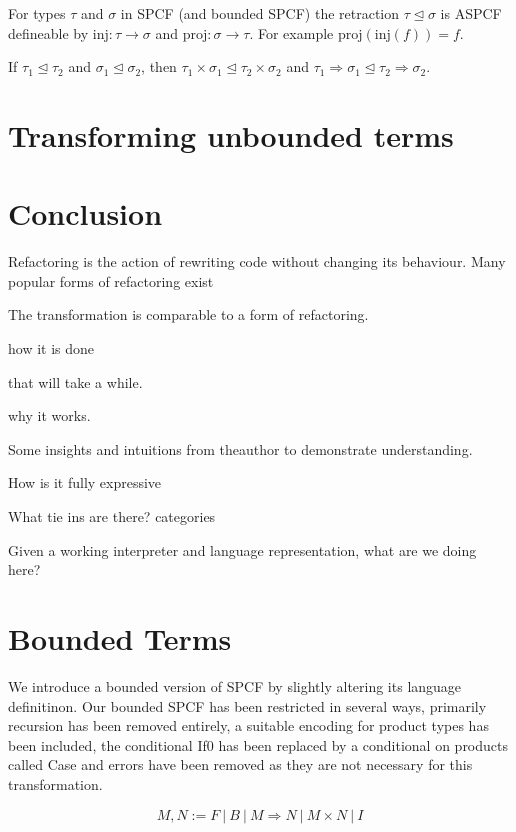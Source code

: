 \documentclass[12pt,a4paper]{report}
\theoremstyle{definition}
\theoremstyle{remark}
\begin{document}
For types $\tau$ and $\sigma$ in SPCF (and bounded SPCF) the retraction $\tau \trianglelefteq \sigma$ is ASPCF defineable by $\text{inj}: \tau \rightarrow \sigma$ and $\text{proj}: \sigma \rightarrow \tau$. For example $\text{proj}(\text{inj}(f))= f$.

If $\tau_1 \trianglelefteq \tau_2$ and $\sigma_1 \trianglelefteq \sigma_2$, then $\tau_1 \times \sigma_1 \trianglelefteq \tau_2 \times \sigma_2$ and $\tau_1 \Rightarrow \sigma_1 \trianglelefteq \tau_2 \Rightarrow \sigma_2 $.

\section{Transforming unbounded terms}

\section{Conclusion}




Refactoring is the action of rewriting code without changing its behaviour. Many popular forms of refactoring exist 

The transformation is comparable to a form of refactoring. 

how it is done 

that will take a while.

why it works.

Some insights and intuitions from theauthor to demonstrate understanding.

How is it fully expressive

What tie ins are there? categories

Given a working interpreter
and language representation, what are we doing here?

\section{Bounded Terms}
We introduce a bounded version of SPCF by slightly altering its language definitinon. Our bounded SPCF has been restricted in several ways, primarily recursion has been removed entirely, a suitable encoding for product types has been included, the conditional If0 has been replaced by a conditional on products called Case and errors have been removed as they are not necessary for this transformation.

\begin{equation}
    M,N := F\ |\ B\ |\ M \Rightarrow N\ |\ M \times N\ |\ I 
\end{equation}
\end{document}
